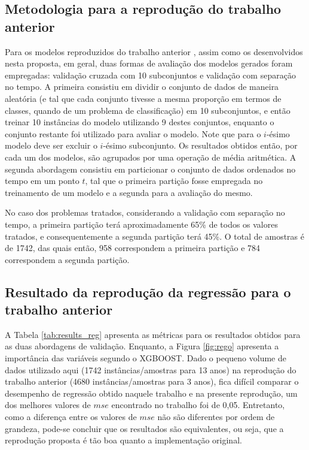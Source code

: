 \subsection{Metodologia para a reprodução do trabalho anterior}

Para os modelos reproduzidos do trabalho anterior \cite{REZENDE:2009, REZENDE:2010}, assim como os desenvolvidos nesta proposta, em geral, duas formas de avaliação dos modelos gerados foram empregadas: validação cruzada com 10 subconjuntos e validação com separação no tempo. A primeira consistiu em dividir o conjunto de dados de maneira aleatória (e tal que cada conjunto tivesse a mesma proporção em termos de classes, quando de um problema de classificação) em 10 subconjuntos, e então treinar 10 instâncias do modelo utilizando 9 destes conjuntos, enquanto o conjunto restante foi utilizado para avaliar o modelo. Note que para o $i$-ésimo modelo deve ser excluir o $i$-ésimo subconjunto. Os resultados obtidos então, por cada um dos modelos, são agrupados por uma operação de média aritmética. A segunda abordagem consistiu em particionar o conjunto de dados ordenados no tempo em um ponto $t$, tal que o primeira partição fosse empregada no treinamento de um modelo e a segunda para a avaliação do mesmo.

No caso dos problemas tratados, considerando a validação com separação no tempo, a primeira partição terá aproximadamente 65\% de todos os valores tratados, e consequentemente a segunda partição terá 45\%. O total de amostras é de 1742, das quais então, 958 correspondem a primeira partição e 784 correspondem a segunda partição.


\subsection{Resultado da reprodução da regressão para o trabalho anterior}

A Tabela \ref{tab:results_reg} apresenta as métricas para os resultados obtidos para as duas abordagens de validação. Enquanto, a Figura \ref{fig:rego} apresenta a importância das variáveis segundo o XGBOOST. Dado o pequeno volume de dados utilizado aqui (1742 instâncias/amostras para 13 anos) na reprodução do trabalho anterior (4680 instâncias/amostras para 3 anos), fica difícil comparar o desempenho de regressão obtido naquele trabalho e na presente reprodução, um dos melhores valores de $mse$ encontrado no trabalho \cite{REZENDE:2009, REZENDE:2010} foi de 0,05. Entretanto, como a diferença entre os valores de $mse$ não são diferentes por ordem de grandeza, pode-se concluir que os resultados são equivalentes, ou seja, que a reprodução proposta é tão boa quanto a implementação original.

